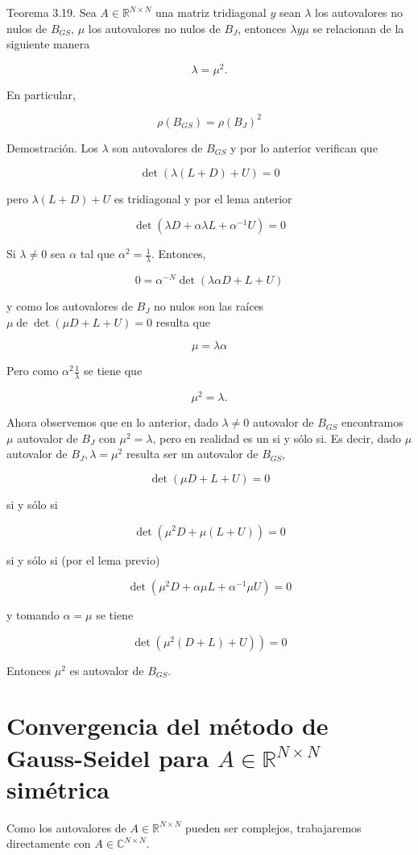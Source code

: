 \documentclass[10pt]{book}
\begin{document}
Teorema 3.19. Sea $A \in \mathbb{R}^{N \times N}$ una matriz tridiagonal $y$ sean $\lambda$ los autovalores no nulos de $B_{G S}$, $\mu$ los autovalores no nulos de $B_{J}$, entonces $\lambda y \mu$ se relacionan de la siguiente manera

$$
\lambda=\mu^{2} .
$$

En particular,

$$
\rho\left(B_{G S}\right)=\rho\left(B_{J}\right)^{2}
$$

Demostración. Los $\lambda$ son autovalores de $B_{G S}$ y por lo anterior verifican que

$$
\operatorname{det}(\lambda(L+D)+U)=0
$$

pero $\lambda(L+D)+U$ es tridiagonal y por el lema anterior

$$
\operatorname{det}\left(\lambda D+\alpha \lambda L+\alpha^{-1} U\right)=0
$$

Si $\lambda \neq 0$ sea $\alpha$ tal que $\alpha^{2}=\frac{1}{\lambda}$. Entonces,

$$
0=\alpha^{-N} \operatorname{det}(\lambda \alpha D+L+U)
$$

y como los autovalores de $B_{J}$ no nulos son las raíces $\mu \operatorname{de} \operatorname{det}(\mu D+L+U)=0$ resulta que

$$
\mu=\lambda \alpha
$$

Pero como $\alpha^{2} \frac{1}{\lambda}$ se tiene que

$$
\mu^{2}=\lambda .
$$

Ahora observemos que en lo anterior, dado $\lambda \neq 0$ autovalor de $B_{G S}$ encontramos $\mu$ autovalor de $B_{J}$ con $\mu^{2}=\lambda$, pero en realidad es un si y sólo si. Es decir, dado $\mu$ autovalor de $B_{J}, \lambda=\mu^{2}$ resulta ser un autovalor de $B_{G S}$,

$$
\operatorname{det}(\mu D+L+U)=0
$$

si y sólo si

$$
\operatorname{det}\left(\mu^{2} D+\mu(L+U)\right)=0
$$

si y sólo si (por el lema previo)

$$
\operatorname{det}\left(\mu^{2} D+\alpha \mu L+\alpha^{-1} \mu U\right)=0
$$

y tomando $\alpha=\mu$ se tiene

$$
\left.\operatorname{det}\left(\mu^{2}(D+L)+U\right)\right)=0
$$

Entonces $\mu^{2}$ es autovalor de $B_{G S}$.

\section*{Convergencia del método de Gauss-Seidel para $A \in \mathbb{R}^{N \times N}$ simétrica}
Como los autovalores de $A \in \mathbb{R}^{N \times N}$ pueden ser complejos, trabajaremos directamente con $A \in \mathbb{C}^{N \times N}$.
\end{document}
